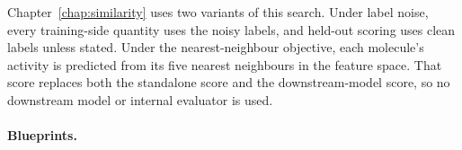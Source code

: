 Chapter~\ref{chap:similarity} uses two variants of this search. Under label noise, every training-side quantity uses the noisy labels, and held-out scoring uses clean labels unless stated. Under the nearest-neighbour objective, each molecule's activity is predicted from its five nearest neighbours in the feature space. That score replaces both the standalone score and the downstream-model score, so no downstream model or internal evaluator is used.



\paragraph{Blueprints.}
